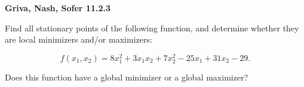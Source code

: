 \textbf{Griva, Nash, Sofer 11.2.3}

Find all stationary points of the following function, and determine whether they are local minimizers and/or maximizers:

$$
f(x_1, x_2) = 8x_1^2 + 3 x_1 x_2 + 7 x_2^2 - 25 x_1 + 31 x_2 - 29.
$$

Does this function have a global minimizer or a global maximizer?

\begin{solution}
    \ \\
    \vfill
\end{solution}
